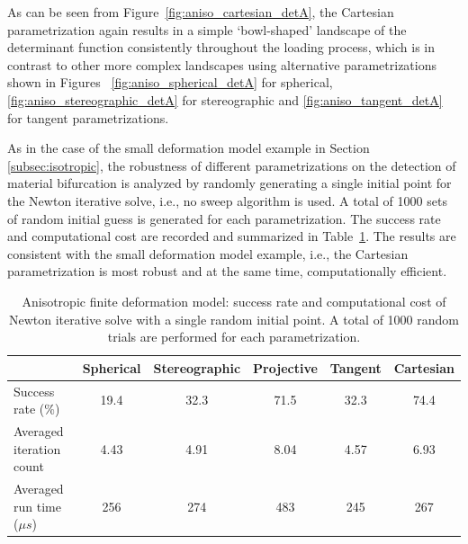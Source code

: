 \documentclass[12pt]{article}
\numberwithin{equation}{section}
\begin{document}
As can be seen from Figure~\ref{fig:aniso_cartesian_detA}, the 
Cartesian parametrization again results in a simple `bowl-shaped' 
landscape of the determinant function consistently throughout the 
loading process, which is in contrast to other more complex landscapes 
using alternative parametrizations shown in Figures~ 
\ref{fig:aniso_spherical_detA} for spherical, 
\ref{fig:aniso_stereographic_detA} for stereographic and 
\ref{fig:aniso_tangent_detA} for tangent parametrizations. 

As in the case of the small deformation model example in 
Section \ref{subsec:isotropic}, the robustness of different 
parametrizations on the detection of material bifurcation is analyzed 
by randomly generating a single initial point for the Newton iterative 
solve, i.e., no sweep algorithm is used. A total of 1000 sets of 
random initial guess is generated for each parametrization. The 
success rate and computational cost are recorded and summarized in 
Table~\ref{tab:aniso_axial_random_para}. The results are consistent 
with the small deformation model example, i.e., the Cartesian 
parametrization is most robust and at the same time, computationally efficient. 

\begin{table}[H]
  \begin{center}
    \begin{tabular}{l | c c c c c}
      \toprule
        &  Spherical    &   Stereographic   & Projective   &   Tangent   &   Cartesian                 \\
      \midrule
      Success rate ($\%$)                      &    19.4    &    32.3     &    71.5     &    32.3     &     74.4          \\ 
      Averaged iteration count               &    4.43    &    4.91    &    8.04     &    4.57    &    6.93         \\
      Averaged run time (${\mu}s$)     &    256     &    274     &    483      &    245      &    267         \\
      \bottomrule
    \end{tabular}
    \caption{Anisotropic finite deformation model: success rate and computational cost of Newton iterative solve with a single random initial point. A total of 1000 random trials are performed for each parametrization.}
    \label{tab:aniso_axial_random_para}
  \end{center}
\end{table}
\end{document}
